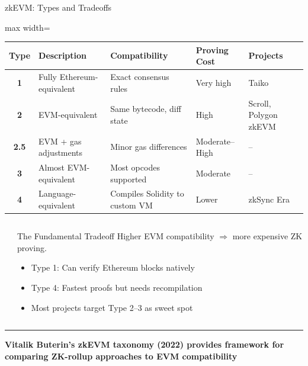 \documentclass[8pt,aspectratio=169]{beamer}
\newcommand{\bottomnote}[1]{\vfill\vspace{-2mm}\textcolor{mllavender2}{\rule{\textwidth}{0.4pt}}\vspace{1mm}\footnotesize\textbf{#1}}
\begin{document}
\begin{frame}{zkEVM: Types and Tradeoffs}
\footnotesize
\begin{center}
\begin{adjustbox}{max width=\textwidth}
\begin{tabular}{c l l l l}
\toprule
\textbf{Type} & \textbf{Description} & \textbf{Compatibility} & \textbf{Proving Cost} & \textbf{Projects} \\
\midrule
\textbf{1} & Fully Ethereum-equivalent & Exact consensus rules & Very high & Taiko \\
\textbf{2} & EVM-equivalent & Same bytecode, diff state & High & Scroll, Polygon zkEVM \\
\textbf{2.5} & EVM + gas adjustments & Minor gas differences & Moderate--High & -- \\
\textbf{3} & Almost EVM-equivalent & Most opcodes supported & Moderate & -- \\
\textbf{4} & Language-equivalent & Compiles Solidity to custom VM & Lower & zkSync Era \\
\bottomrule
\end{tabular}
\end{adjustbox}
\end{center}
\vspace{0.2cm}
\begin{columns}[T]
\begin{center}
\end{center}
\begin{alertblock}{\footnotesize The Fundamental Tradeoff}
\footnotesize
Higher EVM compatibility $\Rightarrow$ more expensive ZK proving.
\begin{itemize}
\item Type 1: Can verify Ethereum blocks natively
\item Type 4: Fastest proofs but needs recompilation
\item Most projects target Type 2--3 as sweet spot
\end{itemize}
\end{alertblock}
\end{columns}
\bottomnote{Vitalik Buterin's zkEVM taxonomy (2022) provides framework for comparing ZK-rollup approaches to EVM compatibility}
\end{frame}
\end{document}
